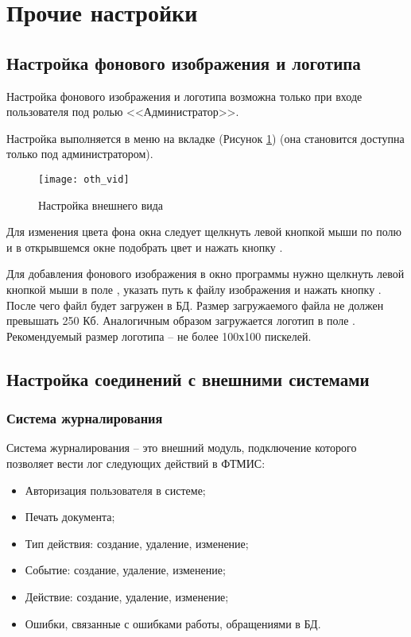 \newpage
\section{Прочие настройки}

\subsection{Настройка фонового изображения и логотипа}

Настройка фонового изображения и логотипа возможна только при входе пользователя под ролью <<Администратор>>.

Настройка выполняется в меню  на вкладке  (Рисунок \ref{img_oth_vid}) (она становится доступна только под администратором).

\begin{figure}[ht]\centering
 \texttt{[image: oth\_vid]}
 \caption{Настройка внешнего вида}
 \label{img_oth_vid}
\end{figure}

Для изменения цвета фона окна следует щелкнуть левой кнопкой мыши по полю  и в открывшемся окне подобрать цвет и нажать кнопку .

Для добавления фонового изображения в окно программы нужно щелкнуть левой кнопкой мыши в поле , указать путь к файлу изображения и нажать кнопку  . После чего файл будет загружен в БД. Размер загружаемого файла не должен превышать 250 Кб. Аналогичным образом загружается логотип в поле . Рекомендуемый размер логотипа – не более 100х100 пискелей.

\subsection{Настройка соединений с внешними системами}

\subsubsection{Система журналирования}

Система журналирования – это внешний модуль, подключение которого позволяет вести лог следующих действий в ФТМИС:
\begin{itemize}
 \item Авторизация пользователя в системе;
 \item Печать документа;
 \item Тип действия: создание, удаление, изменение;
 \item Событие: создание, удаление, изменение;
 \item Действие: создание, удаление, изменение;
 \item Ошибки, связанные с ошибками работы, обращениями в БД.
\end{itemize}
 
